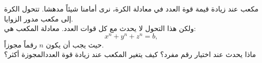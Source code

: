 \begin{surferPage}[Cube]{مكعب}
عند زيادة قيمة قوة العدد في معادلة الكرة، نرى أمامنا شيئاً مدهشا. تتحول الكرة إلى مكعب مدور الزوايا.\\
\vspace{0.3cm}
ولكن هذا التحول لا يحدث مع كل قوات العدد. معادلة المكعب هي:
\[x^n+y^n+z^n=b,\]
حيث يجب أن يكون $n$ رقماً مجوزاً.\\
\vspace{0.3cm}
ماذا يحدث عند اختيار رقم مفرد؟ كيف يتغير المكعب عند زيادة قوة العددالمجوزة أكثر؟
\end{surferPage}